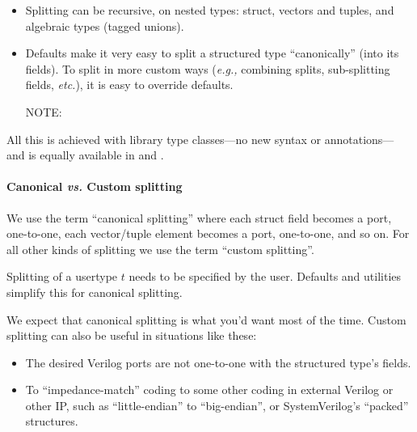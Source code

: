 \begin{itemize}

  \item Splitting can be recursive, on nested types: struct, vectors
    and tuples, and algebraic types (tagged unions).

  \item Defaults make it very easy to split a structured type
    ``canonically'' (into its fields). To split in more custom ways
    (\emph{e.g.,} combining splits, sub-splitting fields,
    \emph{etc.}), it is easy to override defaults.

    NOTE: \hfill {}

\end{itemize}

All this is achieved with library type classes---no new syntax or
annotations--- and is equally available in {\BSVb} and {\BHb}.


\paragraph{Canonical \emph{vs.} Custom splitting}

\hspace*{1em}


We use the term ``canonical splitting'' where each struct field
becomes a port, one-to-one, each vector/tuple element becomes a port,
one-to-one, and so on.  For all other kinds of splitting we use the
term ``custom splitting''.

Splitting of a usertype $t$ needs to be specified by the user.
Defaults and utilities simplify this for canonical splitting.

We expect that canonical splitting is what you'd want most of the
time.  Custom splitting can also be useful in situations like these:

\begin{itemize}

  \item The desired Verilog ports are not one-to-one with the
    {\BLANGS} structured type's fields.

  \item To ``impedance-match'' {\BLANGS} coding to some other coding
    in external Verilog or other IP, such as ``little-endian'' to
    ``big-endian'', or SystemVerilog's ``packed'' structures.

\end{itemize}


